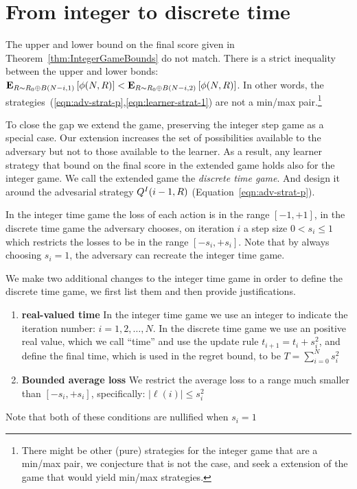 \documentclass{article}[12pt]
\begin{document}
\section{From integer to discrete time}
\label{sec:discrete}

The upper and lower bound on the final score given in
Theorem~\ref{thm:IntegerGameBounds} do not match. There is a strict
inequality between the upper and lower
bonds:${\bf E}_{R \sim R_0 \oplus B(N-i,1)}\left[ \phi(N,R) \right] < {\bf E}_{R \sim R_0
  \oplus B(N-i,2)}\left[ \phi(N,R) \right]$. In other words, the
strategies~(\ref{eqn:adv-strat-p},\ref{eqn:learner-strat-1}) are not a
min/max pair.\footnote{There might be other (pure) strategies for the integer
game that are a min/max pair, we conjecture that is not the case, and
seek a extension of the game that would yield min/max strategies.}

To close the gap we extend the game, preserving the integer step game
as a special case. Our extension increases the set of possibilities
available to the adversary but not to those available to the learner. As a result, any
learner strategy that bound on the final score in the extended game holds also for the
integer game. We call the extended game the {\em discrete time
  game}. And design it around the advesarial strategy
$Q^I(i-1,R)$ (Equation~\ref{eqn:adv-strat-p}).

In the integer time game the loss of each action is in the range
$[-1,+1]$, in the discrete time game the adversary chooses, on
iteration $i$ a step size $0<s_i\leq 1$ which restricts the losses to
be in the range $[-s_i,+s_i]$. Note that by always choosing $s_i=1$,
the adversary can recreate the integer time game.

We make two additional changes to the integer time game in order to define
the discrete time game, we first list them and then provide justifications.
\begin{enumerate}
\item {\bf real-valued time} In the integer time game we use an
  integer to indicate the iteration number: $i=1,2,\ldots,N$. In the
  discrete time game we use an positive real value, which we call
  ``time'' and use the update rule $t_{i+1} = t_i + s_i^2$, and define
  the final time, which is used in the regret bound, to be
  $T=\sum_{i=0}^N s_i^2$
\item {\bf Bounded average loss} We restrict the average loss to a
  range much smaller than $[-s_i,+s_i]$, specifically:
  $|\ell(i)| \leq s_i^2$
\end{enumerate}
Note that both of these conditions are nullified when $s_i=1$
\end{document}
